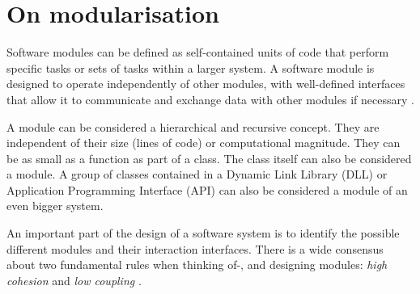 \section{On modularisation} \label{sec:on_modules}

Software modules can be defined as self-contained units of code that perform specific
tasks or sets of tasks within a larger system. A software module is designed to operate
independently of other modules, with well-defined interfaces that allow it to communicate
and exchange data with other modules if necessary \autocite[22]{mannaert_normalized_2016}.

A module can be considered a hierarchical and recursive concept. They are independent of
their size (lines of code) or computational magnitude. They can be as small as a function
as part of a class. The class itself can also be considered a module. A group of classes
contained in a Dynamic Link Library (DLL) or Application Programming Interface (API) can
also be considered a module of an even bigger system. 

An important part of the design of a software system is to identify the possible different
modules and their interaction interfaces. There is a wide consensus about two fundamental
rules when thinking of-, and designing modules: \emph{high cohesion} and \emph{low
coupling} \autocite[22]{mannaert_normalized_2016}.